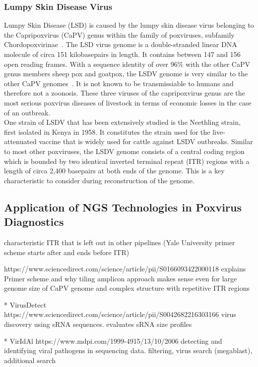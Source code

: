 \subsubsection*{Lumpy Skin Disease Virus}
Lumpy Skin Disease (LSD) is caused by the lumpy skin disease virus belonging to the Capripoxvirus (CaPV) genus within the family of poxviruses, subfamily Chordopoxvirinae~\cite{walker2019changes}. The LSD virus genome is a double-stranded linear DNA molecule of circa 151 kilobasepairs in length. It contains between 147 and 156 open reading frames. With a sequence identity of over 96\% with the other CaPV genus members sheep pox and goatpox, the LSDV genome is very similar to the other CaPV genomes~\cite{tulman2001genome}. It is not known to be transmissiable to humans and therefore not a zoonosis. These three viruses of the capripoxvirus genus are the most serious poxvirus diseases of livestock in terms of economic losses in the case of an outbreak. \\
One strain of LSDV that has been extensively studied is the Neethling strain, first isolated in Kenya in 1958. It constitutes the strain used for the live-attenuated vaccine that is widely used for cattle against LSDV outbreaks. Similar to most other poxviruses, the LSDV genome consists of a central coding region which is bounded by two identical inverted terminal repeat (ITR) regions with a length of circa 2,400 basepairs at both ends of the genome. This is a key characteristic to consider during reconstruction of the genome. 

\subsection{Application of NGS Technologies in Poxvirus Diagnostics}
characteristic ITR that is left out in other pipelines (Yale University primer scheme starts after and ends before ITR)

https://www.sciencedirect.com/science/article/pii/S0166093422000118 explains Primer scheme and why tiling amplicon approach makes sense even for large genome size of CaPV genome and complex structure with repetitive ITR regions

* VirusDetect https://www.sciencedirect.com/science/article/pii/S0042682216303166
virus discovery using sRNA sequences. evaluates sRNA size profiles

* VirIdAl https://www.mdpi.com/1999-4915/13/10/2006
detecting and identifying viral pathogens in sequencing data. filtering, virus search (megablast), additional search

